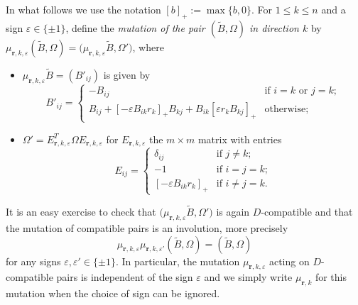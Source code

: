 \documentclass{amsart}
\numberwithin{equation}{section}
\newcommand{\bfr}{{\boldsymbol{r}}}
\renewcommand{\max}{\operatorname{max}}
\begin{document}
In what follows we use the notation $[b]_+:=\max\{b,0\}$.
For $1\le k\le n$ and a sign $\varepsilon\in\{\pm1\}$, define the \emph{mutation of the pair $(\tilde B,\Omega)$ in direction $k$} by $\mu_{\bfr,k,\varepsilon}(\tilde B,\Omega)=\big(\mu_{\bfr,k,\varepsilon}\tilde B,\Omega'\big)$, where
\begin{itemize}
  \item $\mu_{\bfr,k,\varepsilon}\tilde B=(B'_{ij})$ is given by
    \[B'_{ij}=\begin{cases}-B_{ij} & \text{if $i=k$ or $j=k$;}\\ B_{ij} + [-\varepsilon B_{ik}r_k]_+ B_{kj} + B_{ik} [\varepsilon r_kB_{kj}]_+ & \text{otherwise;}\end{cases}\]
  \item $\Omega'=E_{\bfr,k,\varepsilon}^T\Omega E_{\bfr,k,\varepsilon}$ for $E_{\bfr,k,\varepsilon}$ the $m\times m$ matrix with entries
    \[E_{ij}=\begin{cases}\delta_{ij} & \text{if $j\ne k$;}\\ -1 & \text{if $i=j=k$;}\\ [-\varepsilon B_{ik}r_k]_+ & \text{if $i\ne j=k$.}\end{cases}\]
\end{itemize}
It is an easy exercise to check that $\big(\mu_{\bfr,k,\varepsilon}\tilde B,\Omega'\big)$ is again $D$-compatible and that the mutation of compatible pairs is an involution, more precisely 
\[\mu_{\bfr,k,\varepsilon}\mu_{\bfr,k,\varepsilon'}(\tilde B,\Omega)=(\tilde B,\Omega)\]
for any signs $\varepsilon,\varepsilon'\in\{\pm1\}$.
In particular, the mutation $\mu_{\bfr,k,\varepsilon}$ acting on $D$-compatible pairs is independent of the sign $\varepsilon$ and we simply write $\mu_{\bfr,k}$ for this mutation when the choice of sign can be ignored.
\end{document}
